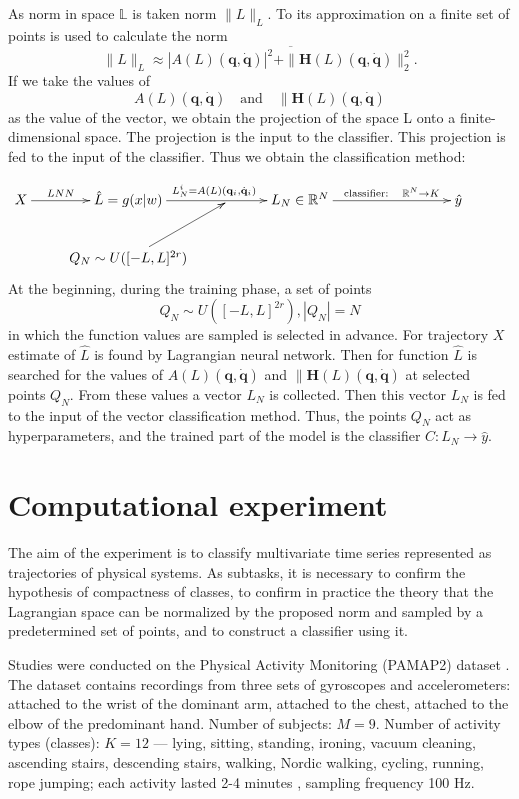 \documentclass[12pt]{paper}
\begin{document}
As norm in space $\mathbb{L}$ is taken norm $\|L\|_L$. To its approximation on a finite set of points is used to calculate the norm 
\[
\|L\|_L \approx \overline{|A(L)\left(\mathbf{q}, \dot{\mathbf{q}}\right)|^2 + \|\mathbf{H}(L)\left(\mathbf{q}, \dot{\mathbf{q}}\right)\|_2^2}.
\] 
If we take the values of 
\[A(L)\left(\mathbf{q}, \dot{\mathbf{q}}\right) 
\quad \text{and} \quad 
\|\mathbf{H}(L)\left(\mathbf{q}, \dot{\mathbf{q}}\right) 
\]
as the value of the vector, we obtain the projection of the space L onto a finite-dimensional space. The projection is the input to the classifier. This projection is fed to the input of the classifier. Thus we obtain the classification method: 

\begin{equation}
\xymatrix{
X  \ar@{->}[r]^-{LNN}  & \hat{L}=g(x|w) \ar@{->}[rr]^{{L_N^{i} = A(L)\left(\mathbf{q}_i, \dot{\mathbf{q}}_i\right)}} & {} & L_N \in \mathbb{R}^N \ar@{->}[rrr]^-{\text{classifier}:\quad \mathbb{R}^N \to K} &  &  & \hat{y} \\
 & Q_N \sim U([-L, L]^{2r}) \ar@{->}[ur]  &  &  &  &  &  &
}
\label{fig: classificator}
\end{equation}
At the beginning, during the training phase, a set of points 
\[
Q_N \sim U([-L, L]^{2r}), |Q_N| = N
\] 
in which the function values are sampled is selected in advance. For trajectory $X$ estimate of $\hat{L}$ is found by Lagrangian neural network. Then for
function $\hat{L}$ is searched for the values of $A(L)\left(\mathbf{q}, \dot{\mathbf{q}}\right)$ and $\|\mathbf{H}(L)\left(\mathbf{q}, \dot{\mathbf{q}}\right)$ at selected points $Q_N$. From these values a vector $L_N$ is collected. Then this vector $L_N$ is fed to the input of the vector classification method. Thus, the points  $Q_N$ act as hyperparameters, and the trained part of the model is the classifier $C: L_N \to \hat{y}$.

\section{Computational experiment}
The aim of the experiment is to classify multivariate time series represented as trajectories
of physical systems. As subtasks, it is necessary to confirm the hypothesis of compactness of
classes, to confirm in practice the theory that the Lagrangian space can be normalized by the
proposed norm and sampled by a predetermined set of points, and to construct a classifier using
it.

Studies were conducted on the Physical Activity Monitoring (PAMAP2) dataset \cite{dataset}.
The
dataset contains recordings from three sets of gyroscopes and accelerometers: attached to the
wrist of the dominant arm, attached to the chest, attached to the elbow of the predominant hand. Number of subjects: $M = 9$. Number of activity types (classes): $K = 12$ — lying, sitting, standing, ironing, vacuum cleaning, ascending stairs, descending stairs, walking, Nordic walking, cycling, running, rope jumping; each activity lasted 2-4 minutes \cite{dataset}, sampling frequency 100 Hz.
\end{document}
